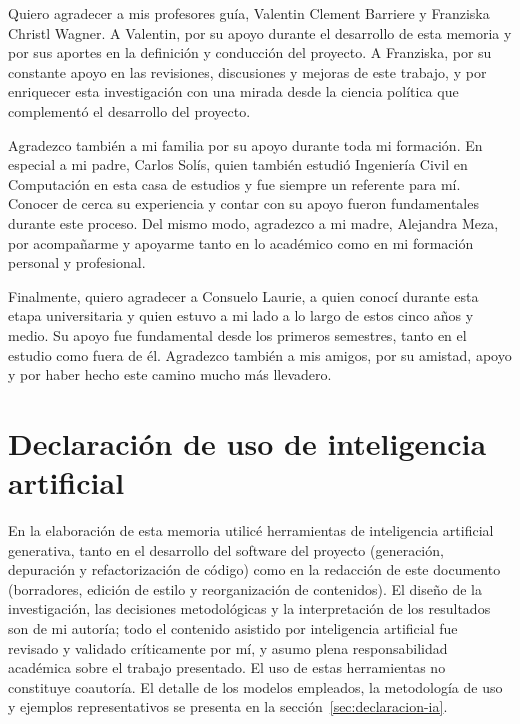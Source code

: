 \documentclass{umemoria}
\begin{document}

\begin{thanks}
Quiero agradecer a mis profesores guía, Valentin Clement Barriere y Franziska Christl Wagner. A Valentin, por su apoyo durante el desarrollo de esta memoria y por sus aportes en la definición y conducción del proyecto. A Franziska, por su constante apoyo en las revisiones, discusiones y mejoras de este trabajo, y por enriquecer esta investigación con una mirada desde la ciencia política que complementó el desarrollo del proyecto.

Agradezco también a mi familia por su apoyo durante toda mi formación. En especial a mi padre, Carlos Solís, quien también estudió Ingeniería Civil en Computación en esta casa de estudios y fue siempre un referente para mí. Conocer de cerca su experiencia y contar con su apoyo fueron fundamentales durante este proceso. Del mismo modo, agradezco a mi madre, Alejandra Meza, por acompañarme y apoyarme tanto en lo académico como en mi formación personal y profesional.

Finalmente, quiero agradecer a Consuelo Laurie, a quien conocí durante esta etapa universitaria y quien estuvo a mi lado a lo largo de estos cinco años y medio. Su apoyo fue fundamental desde los primeros semestres, tanto en el estudio como fuera de él. Agradezco también a mis amigos, por su amistad, apoyo y por haber hecho este camino mucho más llevadero.
\end{thanks}

\tableofcontents
\listoftables  %
\listoffigures %

\chapter*{Declaración de uso de inteligencia artificial}
En la elaboración de esta memoria utilicé herramientas de inteligencia artificial
generativa, tanto en el desarrollo del software del proyecto (generación,
depuración y refactorización de código) como en la redacción de este documento
(borradores, edición de estilo y reorganización de contenidos). El diseño de la
investigación, las decisiones metodológicas y la interpretación de los resultados
son de mi autoría; todo el contenido asistido por inteligencia artificial fue
revisado y validado críticamente por mí, y asumo plena responsabilidad académica
sobre el trabajo presentado. El uso de estas herramientas no constituye
coautoría. El detalle de los modelos empleados, la metodología de uso y ejemplos
representativos se presenta en la sección~\ref{sec:declaracion-ia}.
\end{document}
